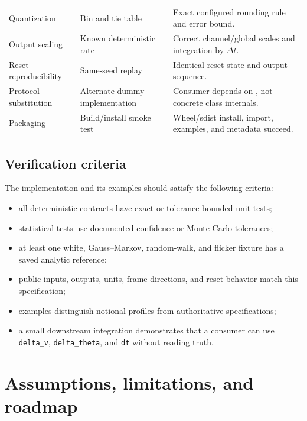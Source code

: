 \documentclass[11pt,oneside,headings=big]{scrreprt}
\newcommand{\field}[1]{\texttt{#1}}
\begin{document}
\begin{longtable}{@{}L{1.45in}L{2.05in}L{2.75in}@{}}
        Quantization & Bin and tie table & Exact configured rounding rule and error bound. \\
        Output scaling & Known deterministic rate & Correct channel/global scales and integration by $\Delta t$. \\
        Reset reproducibility & Same-seed replay & Identical reset state and output sequence. \\
        Protocol substitution & Alternate dummy implementation & Consumer depends on , not concrete class internals. \\
        Packaging & Build/install smoke test & Wheel/sdist install, import, examples, and metadata succeed. \\
        \bottomrule
    \end{longtable}


    \section{Verification criteria}
    The implementation and its examples should satisfy the following criteria:
    \begin{itemize}
        \item all deterministic contracts have exact or tolerance-bounded unit tests;
        \item statistical tests use documented confidence or Monte Carlo tolerances;
        \item at least one white, Gauss--Markov, random-walk, and flicker fixture has a
        saved analytic reference;
        \item public inputs, outputs, units, frame directions, and reset behavior match
        this specification;
        \item examples distinguish notional profiles from authoritative specifications;
        \item a small downstream integration demonstrates that a consumer can use
        \field{delta\_v}, \field{delta\_theta}, and \field{dt} without reading truth.
    \end{itemize}


    \chapter{Assumptions, limitations, and roadmap}
    \label{chap:limitations}
\end{document}
